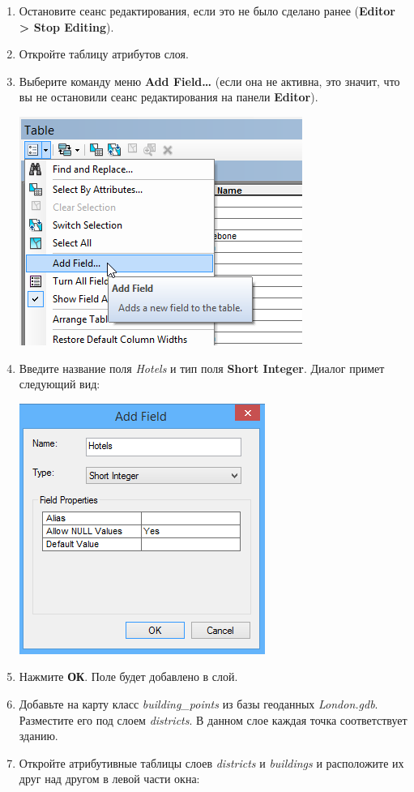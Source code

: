 \documentclass[12pt,]{book}
\begin{document}
\begin{enumerate}
\def\labelenumi{\arabic{enumi}.}
\item
  Остановите сеанс редактирования, если это не было сделано ранее (\textbf{Editor \textgreater{} Stop Editing}).
\item
  Откройте таблицу атрибутов слоя.
\item
  Выберите команду меню \textbf{Add Field\ldots{}} (если она не активна, это значит, что вы не остановили сеанс редактирования на панели \textbf{Editor}).

  \includegraphics{images/Ex07/image14.png}
\item
  Введите название поля \emph{Hotels} и тип поля \textbf{Short Integer}. Диалог примет следующий вид:

  \includegraphics{images/Ex07/image15.png}
\item
  Нажмите \textbf{ОК}. Поле будет добавлено в слой.
\item
  Добавьте на карту класс \emph{building\_points} из базы геоданных \emph{London.gdb}. Разместите его под слоем \emph{districts}. В данном слое каждая точка соответствует зданию.
\item
  Откройте атрибутивные таблицы слоев \emph{districts} и \emph{buildings} и расположите их друг над другом в левой части окна:


\end{enumerate}
\end{document}
